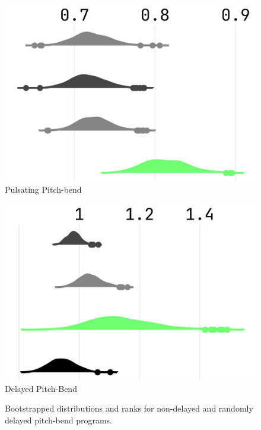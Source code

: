 \documentclass{article} %
\begin{document}
\begin{figure}[t]
\begin{minipage}[t]{\textwidth}
\begin{minipage}[t]{0.91\textwidth}
      \begin{minipage}[t]{0.31\textwidth}
        \centering
        \includegraphics[width=\linewidth]{images/npsk_ood_P_Loss_5.png}
        \vspace{0.3em}
        \footnotesize Pulsating Pitch-bend
      \end{minipage}
            \hspace{0.015\textwidth}%
      \begin{minipage}[t]{0.31\textwidth}
        \centering
        \includegraphics[width=\linewidth]{images/npsk_ood_P_Loss_6.png}
        \vspace{0.3em}
        \footnotesize Delayed Pitch-Bend
      \end{minipage}
    \end{minipage}
  \end{minipage}
  \caption{Bootstrapped distributions and ranks for non-delayed and randomly delayed pitch-bend programs.}
  \label{fig:npsk_pitch-bends}
\end{figure}
\end{document}
